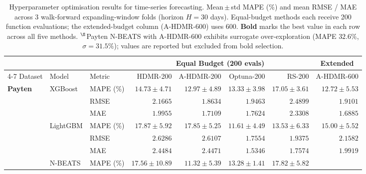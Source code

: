 
\begin{table}[!p]
\centering
\footnotesize
\renewcommand{\arraystretch}{0.88}
\setlength{\tabcolsep}{4pt}
\caption{Hyperparameter optimisation results for time-series forecasting.
  Mean\,$\pm$\,std MAPE (\%) and mean RMSE / MAE across 3 walk-forward expanding-window folds
  (horizon $H{=}30$ days).
  Equal-budget methods each receive 200 function evaluations;
  the extended-budget column (A-HDMR-600) uses 600.
  \textbf{Bold} marks the best value in each row across all five methods.
  $^{\S}$Payten N-BEATS with A-HDMR-600 exhibits surrogate over-exploration
  (MAPE $32.6\%$, $\sigma{=}31.5\%$); values are reported but excluded from bold selection.}
\label{tab:forecast_hpo}
\begin{tabular}{ll l rrrr || r}
\toprule
& & &
  \multicolumn{4}{c||}{Equal Budget (200 evals)} &
  \multicolumn{1}{c}{Extended} \\
\cmidrule(lr){4-7}
Dataset & Model & Metric
  & HDMR-200 & A-HDMR-200 & Optuna-200 & RS-200
  & A-HDMR-600 \\
\midrule
\multirow{15}{*}{\textbf{Payten}}
  & \multirow{3}{*}{XGBoost}
    & MAPE (\%)
      & $14.73 \pm 4.71$ & $12.97 \pm 4.89$ & $13.33 \pm 3.98$ & $17.05 \pm 3.61$
      & $\mathbf{12.72 \pm 5.53}$ \\
  & & RMSE
      & $2.1665$ & $\mathbf{1.8634}$ & $1.9463$ & $2.4899$
      & $1.9101$ \\
  & & MAE
      & $1.9955$ & $1.7109$ & $1.7624$ & $2.3308$
      & $\mathbf{1.6885}$ \\
\cmidrule{2-8}
  & \multirow{3}{*}{LightGBM}
    & MAPE (\%)
      & $17.87 \pm 5.92$ & $17.85 \pm 5.25$ & $\mathbf{11.61 \pm 4.49}$ & $13.53 \pm 6.33$
      & $15.00 \pm 5.52$ \\
  & & RMSE
      & $2.6286$ & $2.6107$ & $\mathbf{1.7554}$ & $1.9375$
      & $2.1582$ \\
  & & MAE
      & $2.4484$ & $2.4471$ & $\mathbf{1.5346}$ & $1.7574$
      & $1.9919$ \\
\cmidrule{2-8}
  & \multirow{3}{*}{N-BEATS}
    & MAPE (\%)
      & $17.56 \pm 10.89$ & $\mathbf{11.32 \pm 5.39}$ & $13.28 \pm 1.41$ & $17.82 \pm 5.82$

\end{tabular}
\end{table}
